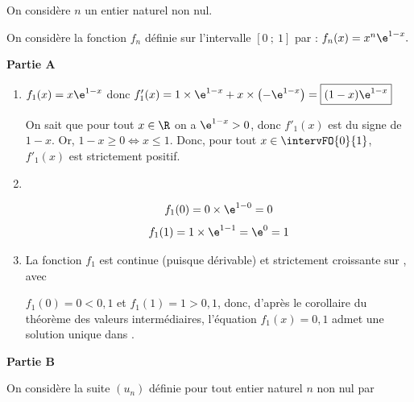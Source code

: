 \smallskip

On considère $n$ un entier naturel non nul.

On considère la fonction $f_n$ définie sur l'intervalle $[0~;~1]$ par :
$f_n(x) = x^n \e^{1 - x}.$

\smallskip

\textbf{Partie A}

\smallskip

\begin{enumerate}
	\item  $f_1(x)=x \e^{1-x}$ donc $f'_{1}(x) = 1 \times \e^{1 - x} + x \times \left(-\e^{1-x}\right) = \boxed{(1-x)\e^{1-x}}$

On sait que pour tout $x \in \R$ on a $\e^{1-x} > 0$, donc $f'_{1}(x)$ est du signe de $1 - x$. Or, $1 - x \geqslant 0 \iff x \leqslant 1$. Donc, pour tout $x \in \intervFO{0}{1}$, $f'_{1}(x)$ est strictement positif.

	\item\
	
\begin{minipage}{.667\textwidth}
	\begin{center}
	\end{center}
	\end{minipage}\hfill
	\begin{minipage}[t]{.275\textwidth}
	\[f_{1}(0) = 0 \times \e^{1-0} = 0\]
	\[f_{1}(1) = 1 \times \e^{1-1} = \e^{0} = 1\]
\end{minipage}

\smallskip

	\item La fonction $f_{1}$ est continue (puisque dérivable) et strictement croissante sur , avec

$f_{1}(0) = 0 < 0,1$ et $f_{1}(1) = 1 > 0,1$, donc, d'après le corollaire du théorème des valeurs intermédiaires, l'équation $f_{1}(x) = 0,1$ admet une solution unique dans .
\end{enumerate}

\smallskip

\textbf{Partie B}

\smallskip

On considère la suite $(u_n)$ définie pour tout entier naturel $n$ non nul par 

